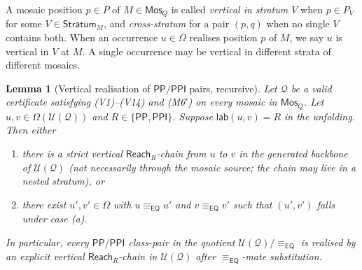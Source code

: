 \documentclass[11pt]{article}
\newtheorem{lemma}[theorem]{Lemma}
\newcommand{\EQ}{\mathsf{EQ}}
\newcommand{\PP}{\mathsf{PP}}
\newcommand{\PPI}{\mathsf{PPI}}
\newcommand{\Q}{\mathcal Q}
\newcommand{\U}{\mathcal U}
\newcommand{\Mos}{\mathsf{Mos}}
\newcommand{\Reach}{\mathrel{\mathsf{Reach}}}
\newcommand{\eqc}{\equiv_{\EQ}}
\newcommand{\lab}{\mathsf{lab}}
\newcommand{\Stratum}{\mathsf{Stratum}}
\begin{document}
A mosaic position $p\in P$ of $M\in\Mos_Q$ is called \emph{vertical
in stratum $V$} when $p\in P_V$ for some $V\in\Stratum_M$, and
\emph{cross-stratum} for a pair $(p,q)$ when no single $V$ contains
both.  When an occurrence $u\in\Omega$ realises position $p$ of
$M$, we say $u$ is vertical in $V$ at $M$.  A single occurrence may
be vertical in different strata of different mosaics.

\begin{lemma}[Vertical realisation of $\PP/\PPI$ pairs, recursive]\label{lem:vertical-realisation}
Let $\Q$ be a valid certificate satisfying (V1)--(V14) and (M6$'$)
on every mosaic in $\Mos_Q$.  Let $u,v\in\Omega(\U(\Q))$ and
$R\in\{\PP,\PPI\}$.  Suppose $\lab(u,v)=R$ in the unfolding.  Then
either
\begin{enumerate}[label=(\alph*)]
\item there is a strict vertical $\Reach_R$-chain from $u$ to $v$
in the generated backbone of $\U(\Q)$ (\emph{not necessarily
through the mosaic source}; the chain may live in a nested
stratum), or
\item there exist $u',v'\in\Omega$ with $u\eqc u'$ and $v\eqc v'$
such that $(u',v')$ falls under case (a).
\end{enumerate}
In particular, every $\PP/\PPI$ class-pair in the quotient
$\U(\Q)/\eqc$ is realised by an explicit vertical $\Reach_R$-chain
in $\U(\Q)$ after $\eqc$-mate substitution.
\end{lemma}
\end{document}

